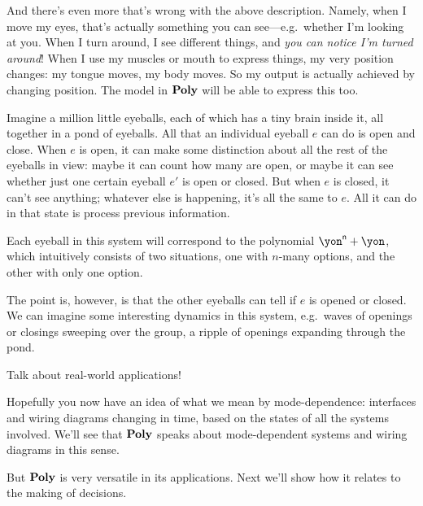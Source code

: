 \documentclass[Book-Poly]{subfiles}
\begin{document}
And there's even more that's wrong with the above description. Namely, when I move my eyes, that's actually something you can see---e.g.\ whether I'm looking at you. When I turn around, I see different things, and \emph{you can notice I'm turned around}! When I use my muscles or mouth to express things, my very position changes: my tongue moves, my body moves. So my output is actually achieved by changing position. The model in $\textbf{Poly}$ will be able to express this too.

\begin{example}
Imagine a million little eyeballs, each of which has a tiny brain inside it, all together in a pond of eyeballs. All that an individual eyeball $e$ can do is open and close. When $e$ is open, it can make some distinction about all the rest of the eyeballs in view: maybe it can count how many are open, or maybe it can see whether just one certain eyeball $e'$ is open or closed. But when $e$ is closed, it can't see anything; whatever else is happening, it's all the same to $e$. All it can do in that state is process previous information.

Each eyeball in this system will correspond to the polynomial $\yon^\ord{n}+\yon$, which intuitively consists of two situations, one with $n$-many options, and the other with only one option.

The point is, however, is that the other eyeballs can tell if $e$ is opened or closed. We can imagine some interesting dynamics in this system, e.g.\ waves of openings or closings sweeping over the group, a ripple of openings expanding through the pond.

Talk about real-world applications!
\end{example}

Hopefully you now have an idea of what we mean by mode-dependence: interfaces and wiring diagrams changing in time, based on the states of all the systems involved. We'll see that $\textbf{Poly}$ speaks about mode-dependent systems and wiring diagrams in this sense. 

But $\textbf{Poly}$ is very versatile in its applications. Next we'll show how it relates to the making of decisions.

\end{document}
